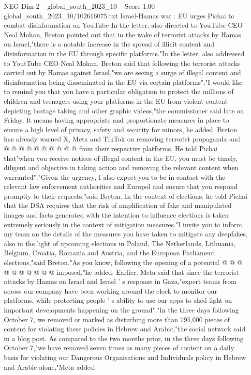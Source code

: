 \begin{textsample}{NEG Dim 2 – global\_south\_2023\_10 – Score 1.00 – global\_south\_2023\_10/102616075.txt}  \label{ex:f2_neg_390}
Israel-Hamas war : EU urges Pichai to combat disinformation on YouTube In the letter, also directed to YouTube CEO Neal Mohan, Breton pointed out that in the wake of terrorist attacks by Hamas on Israel,"there is a notable increase in the spread of illicit content and disinformation in the EU through specific platforms."In the letter, also addressed to YoutTube CEO Neal Mohan, Breton said that following the terrorist attacks carried out by Hamas against Israel,"we are seeing a surge of illegal content and disinformation being disseminated in the EU via certain platforms"."I would like to remind you that you have a particular obligation to protect the millions of children and teenagers using your platforms in the EU from violent content depicting hostage taking and other graphic videos,"the commissioner said late on Friday.
It means having appropriate and proportionate measures in place to ensure a high level of privacy, safety and security for minors, he added.
Breton has already warned X, Meta and TikTok on removing terrorist propaganda and @ @ @ @ @ @ @ @ @ @ from their respective platforms.
He told Pichai that"when you receive notices of illegal content in the EU, you must be timely, diligent and objective in taking action and removing the relevant content when warranted"."Given the urgency, I also expect you to be in contact with the relevant law enforcement authorities and Europol and ensure that you respond promptly to their requests,"said Breton.
In the context of elections, he told Pichai that the DSA requires that the risk of amplification of fake and manipulated images and facts generated with the intention to influence elections is taken extremely seriously in the context of mitigation measures."I invite you to inform my team on the details of the measures you have taken to mitigate any deepfakes, also in the light of upcoming elections in Poland, The Netherlands, Lithuania, Belgium, Croatia, Romania and Austria, and the European Parliament elections,"said Breton."As you know, following the opening of a potential @ @ @ @ @ @ @ @ @ @ imposed,"he added.
Earlier, Meta said that since the terrorist attacks by Hamas on Israel and Israel ' s response in Gaza,"expert teams from across our company have been working around the clock to monitor our platforms, while protecting people ' s ability to use our apps to shed light on important developments happening on the ground"."In the three days following October 7, we removed or marked as disturbing more than 795,000 pieces of content for violating these policies in Hebrew and Arabic,"the social network said in a blog post.
As compared to the two months prior, in the three days following October 7,"we have removed seven times as many pieces of content on a daily basis for violating our Dangerous Organisations and Individuals policy in Hebrew and Arabic alone,"Meta added.

\end{textsample}
